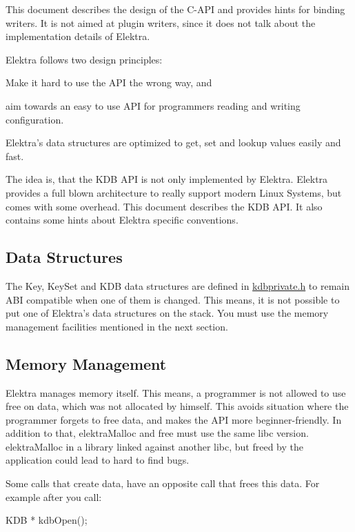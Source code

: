 This document describes the design of the C-\/\+A\+P\+I and provides hints for binding writers. It is not aimed at plugin writers, since it does not talk about the implementation details of Elektra.

Elektra follows two design principles\+:


\begin{DoxyEnumerate}
\item Make it hard to use the A\+P\+I the wrong way, and
\item aim towards an easy to use A\+P\+I for programmers reading and writing configuration.
\end{DoxyEnumerate}

Elektra's data structures are optimized to get, set and lookup values easily and fast.

The idea is, that the K\+D\+B A\+P\+I is not only implemented by Elektra. Elektra provides a full blown architecture to really support modern Linux Systems, but comes with some overhead. This document describes the {\ttfamily K\+D\+B} A\+P\+I. It also contains some hints about Elektra specific conventions.

\subsection*{Data Structures}

The {\ttfamily Key}, {\ttfamily Key\+Set} and {\ttfamily K\+D\+B} data structures are defined in {\ttfamily \hyperlink{kdbprivate_8h}{kdbprivate.\+h}} to remain A\+B\+I compatible when one of them is changed. This means, it is not possible to put one of Elektra's data structures on the stack. You must use the memory management facilities mentioned in the next section.

\subsection*{Memory Management}

Elektra manages memory itself. This means, a programmer is not allowed to use free on data, which was not allocated by himself. This avoids situation where the programmer forgets to free data, and makes the A\+P\+I more beginner-\/friendly. In addition to that, {\ttfamily elektra\+Malloc} and free must use the same libc version. {\ttfamily elektra\+Malloc} in a library linked against another libc, but freed by the application could lead to hard to find bugs.

Some calls that create data, have an opposite call that frees this data. For example after you call\+: \begin{DoxyVerb}    KDB * kdbOpen();
\end{DoxyVerb}


